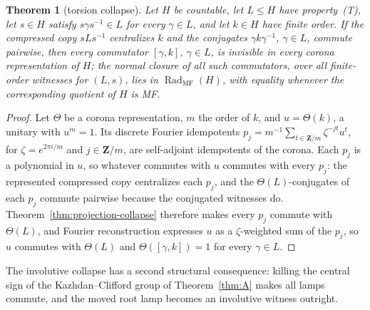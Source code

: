 \documentclass[11pt]{amsart}
\newcommand{\leanverified}[2]{\ignorespaces}
\newtheorem{theorem}{Theorem}[section]
\theoremstyle{definition}
\theoremstyle{remark}
\theoremstyle{plain}
\begin{document}
\begin{theorem}[torsion collapse]\label{thm:torsion-collapse}
Let $H$ be countable, let $L\le H$ have property~\textup{(T)}, let
$s\in H$ satisfy $s\gamma s^{-1}\in L$ for every $\gamma\in L$, and
let $k\in H$ have finite order.  If the compressed copy $sLs^{-1}$
centralizes $k$ and the conjugates $\gamma k\gamma^{-1}$,
$\gamma\in L$, commute pairwise, then every commutator $[\gamma,k]$,
$\gamma\in L$, is invisible in every corona representation of $H$; the
normal closure of all such commutators, over all finite-order witnesses
for $(L,s)$, lies in $\operatorname{Rad}_{\mathrm{MF}}(H)$, with
equality whenever the corresponding quotient of $H$ is MF.
\leanverified{Sofic/TorsionSpectralCollapse}{GroupApproximation.TorsionSpectralCollapse.actualCoronaMFInvisible_of_torsionWitness}
\leanverified{Sofic/TorsionSpectralCollapse}{GroupApproximation.TorsionSpectralCollapse.torsionCollapseDefect_le_actualCoronaMFResidual_of_kazhdan}
\leanverified{Sofic/TorsionSpectralCollapse}{GroupApproximation.TorsionSpectralCollapse.actualCoronaMFResidual_eq_torsionCollapseDefect_of_kazhdan}
\end{theorem}

\begin{proof}
Let $\Theta$ be a corona representation, $m$ the order of $k$, and
$u=\Theta(k)$, a unitary with $u^{m}=1$.  Its discrete Fourier
idempotents
$p_j=m^{-1}\sum_{t\in\mathbf{Z}/m}\zeta^{-jt}u^{t}$, for
$\zeta=e^{2\pi i/m}$ and $j\in\mathbf{Z}/m$, are self-adjoint
idempotents of the corona.  Each $p_j$ is a polynomial in $u$, so
whatever commutes with $u$ commutes with every $p_j$: the represented
compressed copy centralizes each $p_j$, and the
$\Theta(L)$-conjugates of each $p_j$ commute pairwise because the
conjugated witnesses do.  Theorem~\ref{thm:projection-collapse}
therefore makes every $p_j$ commute with $\Theta(L)$, and Fourier
reconstruction expresses $u$ as a $\zeta$-weighted sum of the $p_j$,
so $u$ commutes with $\Theta(L)$ and
$\Theta([\gamma,k])=1$ for every $\gamma\in L$.
\end{proof}

The involutive collapse has a second structural consequence: killing
the central sign of the Kazhdan--Clifford group of
Theorem~\ref{thm:A} makes all lamps commute, and the moved root lamp
becomes an involutive witness outright.
\end{document}
